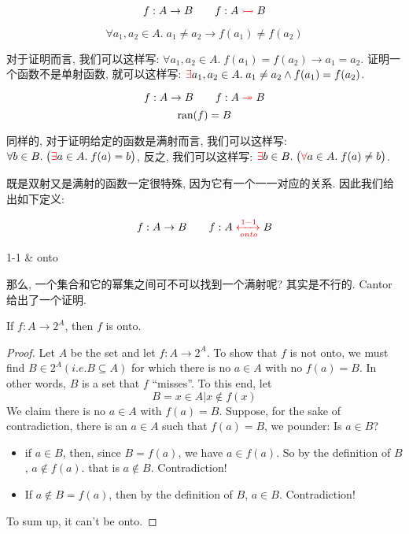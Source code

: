 \begin{definition}
    \[
      f: A \to B \qquad {f: A \textcolor{red}{\;\rightarrowtail\;} B}
    \]

    \[
      \forall a_1, a_2 \in A.\; a_1 \neq a_2 \to f(a_1) \neq f(a_2)
    \]
\end{definition}

对于证明而言, 我们可以这样写: $\forall a_1, a_2 \in A.\; f(a_1) = f(a_2) \to a_1 = a_2$. 证明一个函数不是单射函数, 就可以这样写: $\textcolor{red}{\exists} a_1, a_2 \in A.\; a_1 \neq a_2 \land f(a_1) = f(a_2)$. 

\begin{definition}
    \[
      f: A \to B \qquad {f: A \textcolor{red}{\;\twoheadrightarrow\;} B}
    \]
    \[
      \text{ran}(f) = B
    \]
\end{definition}

同样的, 对于证明给定的函数是满射而言, 我们可以这样写: $\forall b \in B. \; \big(\textcolor{red}{\exists} a \in A.\; f(a) = b \big)$, 反之, 我们可以这样写: $\textcolor{red}{\exists} b \in B.\; \big(\textcolor{red}{\forall} a \in A.\; f(a) \neq b \big)$. 

既是双射又是满射的函数一定很特殊, 因为它有一个一一对应的关系. 因此我们给出如下定义: 

\begin{definition}
    \[
      f: A \to B \qquad {f: A \textcolor{red}{\;\xleftrightarrow[onto]{1-1}\;} B}
    \]
    \begin{center}
      {1-1 \& onto}
    \end{center}
\end{definition}

那么, 一个集合和它的幂集之间可不可以找到一个满射呢? 其实是不行的. Cantor给出了一个证明.

\begin{theorem}
    If $f: A \to 2^{A}$, then $f$ is  onto.
\end{theorem}

\begin{proof}
    Let $A$ be the set and let $f:A\rightarrow 2^A$. To show that $f$ is not onto, we must find $B\in 2^A(i.e. B\subseteq A )$ for which there is no $a\in A$ with no $f(a)=B$. In other words, $B$ is a set that $f$ ``misses''. To this end, let 
    $$
    B={x\in A | x \notin f(x)}
    $$
    We claim there is no $a\in A $ with $f(a)=B$. 
    Suppose, for the sake of contradiction, there is an $a\in A$ such that $f(a)=B$, we pounder: Is $a\in B$?
    \begin{itemize}
        \item if $a\in B$, then, since $B=f(a)$, we have $a\in f(a)$. So by the definition of $B$ , $a\notin f(a)$. that is $a\notin B$. Contradiction!
        \item If $a\notin B=f(a)$, then by the definition of $B$, $a\in B$. Contradiction!  
    \end{itemize} 
    To sum up, it can't be onto. 
\end{proof}

